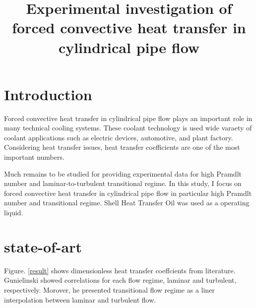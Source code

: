 \documentclass[conference]{IEEEtran}
\begin{document}
\title{Experimental investigation of forced convective heat transfer in cylindrical pipe flow\\
}

\author{
}

\maketitle

\section{Introduction}
Forced convective heat transfer in cylindrical pipe flow plays an important role in many technical cooling systems.
These coolant technology is used wide varaety of coolant applications such as electric devices, automotive, and plant factory.
Considering heat transfer issues, heat transfer coefficients are one of the most important numbers.

Much remains to be studied for providing experimental data for high Pramdlt number and laminar-to-turbulent transitional regime.
In this study, I focus on forced convective heat transfer in cylindrical pipe flow in particular high Pramdlt number and transitional regime.
Shell Heat Transfer Oil was used as a operating liquid.


\section{state-of-art}
Figure. \ref{result} shows dimensionless heat transfer coeffcients from literature.
Gunielinski \cite{Gnienlinski2010} showed correlations for each flow regime, laminar and turbulent, respectively.
Morover, he presented transitional flow regime as a liner interpolation between laminar and turbulent flow.
\end{document}
